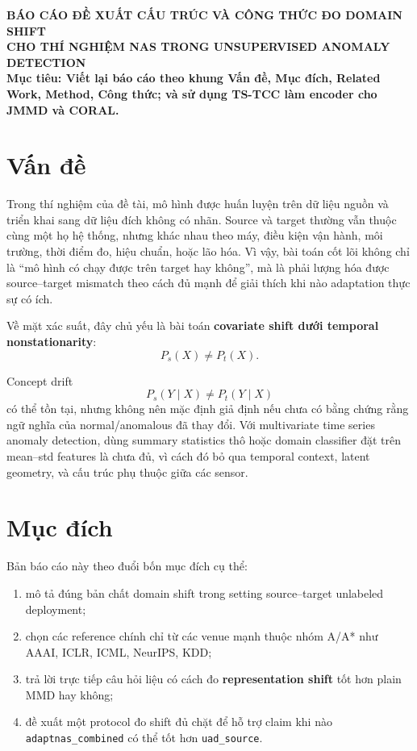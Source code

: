 \documentclass[a4paper]{article}
\begin{document}
\begin{center}
    \textbf{\Large BÁO CÁO ĐỀ XUẤT CẤU TRÚC VÀ CÔNG THỨC ĐO DOMAIN SHIFT}\\[0.2cm]
    \textbf{\Large CHO THÍ NGHIỆM NAS TRONG UNSUPERVISED ANOMALY DETECTION}\\[0.5cm]
    \textbf{Mục tiêu: Viết lại báo cáo theo khung Vấn đề, Mục đích, Related Work, Method, Công thức; và sử dụng TS-TCC làm encoder cho JMMD và CORAL.}
\end{center}

\section{Vấn đề}

Trong thí nghiệm của đề tài, mô hình được huấn luyện trên dữ liệu nguồn và triển khai sang dữ liệu đích không có nhãn. Source và target thường vẫn thuộc cùng một họ hệ thống, nhưng khác nhau theo máy, điều kiện vận hành, môi trường, thời điểm đo, hiệu chuẩn, hoặc lão hóa. Vì vậy, bài toán cốt lõi không chỉ là ``mô hình có chạy được trên target hay không'', mà là phải lượng hóa được source--target mismatch theo cách đủ mạnh để giải thích khi nào adaptation thực sự có ích.

Về mặt xác suất, đây chủ yếu là bài toán \textbf{covariate shift dưới temporal nonstationarity}:
\[
P_s(X) \neq P_t(X).
\]

Concept drift
\[
P_s(Y \mid X) \neq P_t(Y \mid X)
\]
có thể tồn tại, nhưng không nên mặc định giả định nếu chưa có bằng chứng rằng ngữ nghĩa của normal/anomalous đã thay đổi. Với multivariate time series anomaly detection, dùng summary statistics thô hoặc domain classifier đặt trên mean--std features là chưa đủ, vì cách đó bỏ qua temporal context, latent geometry, và cấu trúc phụ thuộc giữa các sensor.

\section{Mục đích}

Bản báo cáo này theo đuổi bốn mục đích cụ thể:
\begin{enumerate}[label=\arabic*.]
    \item mô tả đúng bản chất domain shift trong setting source--target unlabeled deployment;
    \item chọn các reference chính chỉ từ các venue mạnh thuộc nhóm A/A* như AAAI, ICLR, ICML, NeurIPS, KDD;
    \item trả lời trực tiếp câu hỏi liệu có cách đo \textbf{representation shift} tốt hơn plain MMD hay không;
    \item đề xuất một protocol đo shift đủ chặt để hỗ trợ claim khi nào \texttt{adaptnas\_combined} có thể tốt hơn \texttt{uad\_source}.
\end{enumerate}
\end{document}
